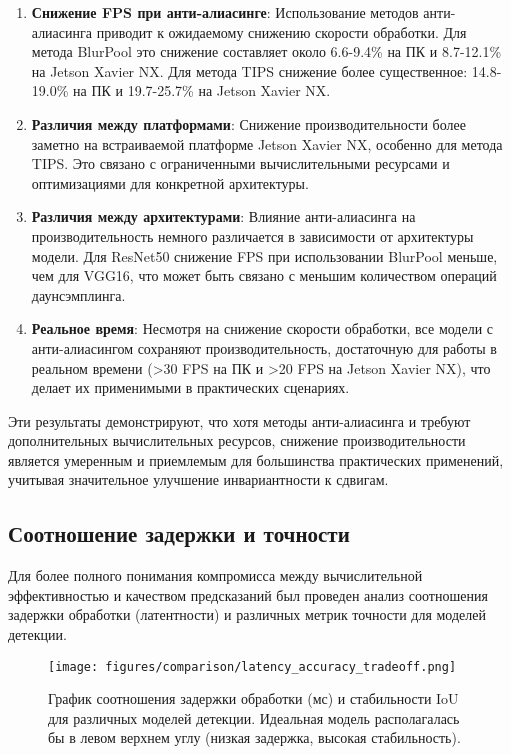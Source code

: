\begin{enumerate}
    \item \textbf{Снижение FPS при анти-алиасинге}: Использование методов анти-алиасинга приводит к ожидаемому снижению скорости обработки. Для метода BlurPool это снижение составляет около 6.6-9.4\% на ПК и 8.7-12.1\% на Jetson Xavier NX. Для метода TIPS снижение более существенное: 14.8-19.0\% на ПК и 19.7-25.7\% на Jetson Xavier NX.
    
    \item \textbf{Различия между платформами}: Снижение производительности более заметно на встраиваемой платформе Jetson Xavier NX, особенно для метода TIPS. Это связано с ограниченными вычислительными ресурсами и оптимизациями для конкретной архитектуры.
    
    \item \textbf{Различия между архитектурами}: Влияние анти-алиасинга на производительность немного различается в зависимости от архитектуры модели. Для ResNet50 снижение FPS при использовании BlurPool меньше, чем для VGG16, что может быть связано с меньшим количеством операций даунсэмплинга.
    
    \item \textbf{Реальное время}: Несмотря на снижение скорости обработки, все модели с анти-алиасингом сохраняют производительность, достаточную для работы в реальном времени (>30 FPS на ПК и >20 FPS на Jetson Xavier NX), что делает их применимыми в практических сценариях.
\end{enumerate}

Эти результаты демонстрируют, что хотя методы анти-алиасинга и требуют дополнительных вычислительных ресурсов, снижение производительности является умеренным и приемлемым для большинства практических применений, учитывая значительное улучшение инвариантности к сдвигам.

\subsection{Соотношение задержки и точности}
\label{experiments:performance:latency_accuracy}

Для более полного понимания компромисса между вычислительной эффективностью и качеством предсказаний был проведен анализ соотношения задержки обработки (латентности) и различных метрик точности для моделей детекции.

\begin{figure}[ht]
\centering
\texttt{[image: figures/comparison/latency\_accuracy\_tradeoff.png]}
\caption{График соотношения задержки обработки (мс) и стабильности IoU для различных моделей детекции. Идеальная модель располагалась бы в левом верхнем углу (низкая задержка, высокая стабильность).}
\label{fig:latency_accuracy}
\end{figure}

